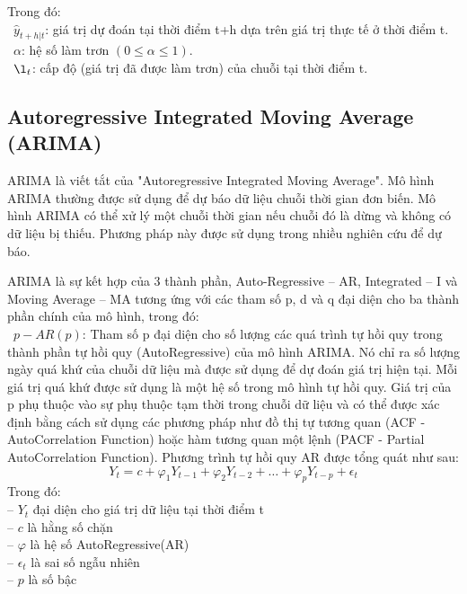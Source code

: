 \documentclass[conference]{IEEEtran}
\begin{document}
Trong đó:\\
\indent\textbullet\ \(\hat{y}_{t+h|t} \): giá trị dự đoán tại thời điểm t+h dựa trên giá trị thực tế ở thời điểm t.\\
\indent\textbullet\ \(\alpha\): hệ số làm trơn \((0\le\alpha\le1)\).\\
\indent\textbullet\ \(\l_t \): cấp độ (giá trị đã được làm trơn) của chuỗi tại thời điểm t.\\


\subsection{Autoregressive Integrated Moving Average (ARIMA)}

ARIMA là viết tắt của "Autoregressive Integrated Moving Average". Mô hình ARIMA thường được sử dụng để dự báo dữ liệu chuỗi thời gian đơn biến. Mô hình ARIMA có thể xử lý một chuỗi thời gian nếu chuỗi đó là dừng và không có dữ liệu bị thiếu. Phương pháp này được sử dụng trong nhiều nghiên cứu để dự báo.

ARIMA là sự kết hợp của 3 thành phần, Auto-Regressive – AR, Integrated – I và Moving Average – MA tương ứng với các tham số p, d và q đại diện cho ba thành phần chính của mô hình, trong đó:
\\
\indent\textbullet\ \(p-AR(p)\): Tham số p đại diện cho số lượng các quá trình tự hồi quy trong thành phần tự hồi quy (AutoRegressive) của mô hình ARIMA. Nó chỉ ra số lượng ngày quá khứ của chuỗi dữ liệu mà được sử dụng để dự đoán giá trị hiện tại. Mỗi giá trị quá khứ được sử dụng là một hệ số trong mô hình tự hồi quy. Giá trị của p phụ thuộc vào sự phụ thuộc tạm thời trong chuỗi dữ liệu và có thể được xác định bằng cách sử dụng các phương pháp như đồ thị tự tương quan (ACF - AutoCorrelation Function) hoặc hàm tương quan một lệnh (PACF - Partial AutoCorrelation Function). Phương trình tự hồi quy AR được tổng quát như sau:\\
\[
    Y_t = c + \varphi_1 Y_{t-1} + \varphi_2 Y_{t-2} + \ldots + \varphi_p Y_{t-p} + \epsilon_t
\]
Trong đó: \\
\indent -- \(Y_t\) đại diện cho giá trị dữ liệu tại thời điểm t\\
\indent -- \(c\) là hằng số chặn\\
\indent -- \(\varphi\) là hệ số AutoRegressive(AR)\\
\indent -- \(\epsilon_t\) là sai số ngẫu nhiên \\
\indent -- \(p\) là số bậc \\
\end{document}
